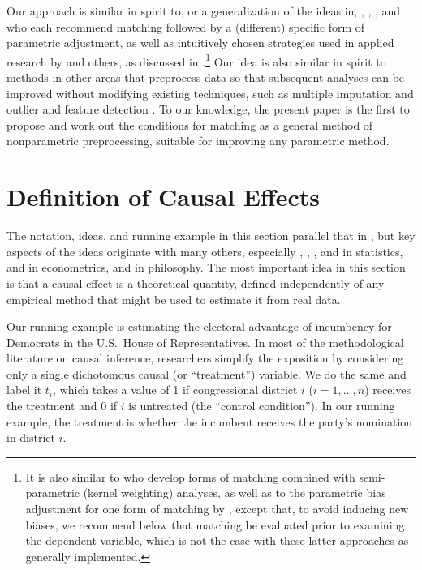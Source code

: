 \documentclass[11pt,titlepage]{article}
\begin{document}
Our approach is similar in spirit to, or a generalization of the ideas
in, \citet{ImaDyk03}, \citet{RosRub84a}, \citet{Rubin79}, and
\citet{RubTho00} who each recommend matching followed by a (different)
specific form of parametric adjustment, as well as intuitively chosen
strategies used in applied research by \citet{Rosenbaum86} and others,
as discussed in \citet{GlaLevMye03}.\footnote{It is also similar to
  \citet{HecIchTod98} who develop forms of matching combined with
  semi-parametric (kernel weighting) analyses, as well as to the
  parametric bias adjustment for one form of matching by
  \citet{AbaImb04}, except that, to avoid inducing new biases, we
  recommend below that matching be evaluated prior to examining the
  dependent variable, which is not the case with these latter
  approaches as generally implemented.}  Our idea is also similar in
spirit to methods in other areas that preprocess data so that
subsequent analyses can be improved without modifying existing
techniques, such as multiple imputation \citep{Rubin87,KinHonJos01}
and outlier and feature detection \citep[][Ch.8]{Bishop95}.  To our
knowledge, the present paper is the first to propose and work out the
conditions for matching as a general method of nonparametric
preprocessing, suitable for improving any parametric method.

\section{Definition of Causal Effects}

The notation, ideas, and running example in this section parallel that
in \citet[][Section 3.1.1]{KinKeoVer94}, but key aspects of the ideas
originate with many others, especially \citet{Neyman23b},
\citet{Fisher35}, \citet{Cox58}, \citet{Rubin74} and \citet{Holland86}
in statistics, \citet{Roy51} and \citet{Quandt72} in econometrics, and
\citet{Lewis73} in philosophy.  The most important idea in this
section is that a causal effect is a theoretical quantity, defined
independently of any empirical method that might be used to estimate
it from real data.

Our running example is estimating the electoral advantage of
incumbency for Democrats in the U.S.\ House of Representatives.  In
most of the methodological literature on causal inference, researchers
simplify the exposition by considering only a single dichotomous
causal (or ``treatment'') variable.  We do the same and label it
$t_i$, which takes a value of 1 if congressional district $i$
($i=1,\dots,n$) receives the treatment and 0 if $i$ is untreated (the
``control condition'').  In our running example, the treatment is
whether the incumbent receives the party's nomination in district $i$.
\end{document}
